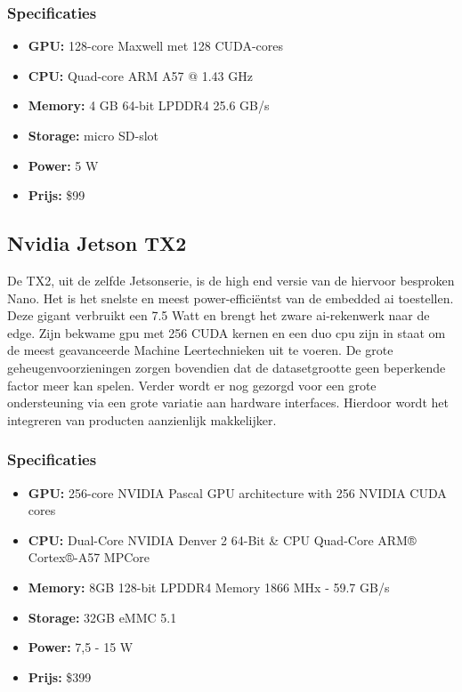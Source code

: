 		\subsubsection{Specificaties}
		\begin{itemize}
			\item \textbf{GPU:} 128-core Maxwell met 128 CUDA-cores
			\item \textbf{CPU:} Quad-core ARM A57 @ 1.43 GHz
			\item \textbf{Memory:} 4 GB 64-bit LPDDR4 25.6 GB/s
			\item \textbf{Storage:}  micro SD-slot
			\item \textbf{Power:} 5 W
			\item \textbf{Prijs:} \$99
		\end{itemize}	
	
	
	\subsection{Nvidia Jetson TX2}
	De TX2, uit de zelfde Jetsonserie, is de high end versie van de hiervoor besproken Nano\citep{bron:jetsontx2}. Het is het snelste en meest power-effici\"entst van de embedded \gls{ai} toestellen. Deze gigant verbruikt een 7.5 Watt en brengt het zware \gls{ai}-rekenwerk naar de edge. Zijn bekwame \gls{gpu} met 256 CUDA kernen en een duo \gls{cpu} zijn in staat om de meest geavanceerde Machine Leertechnieken uit te voeren. De grote geheugenvoorzieningen zorgen bovendien dat de datasetgrootte geen beperkende factor meer kan spelen. Verder wordt er nog gezorgd voor een grote ondersteuning via een grote variatie aan hardware interfaces. Hierdoor wordt het integreren van producten aanzienlijk makkelijker.
	
		\subsubsection{Specificaties}
		\begin{itemize}
			\item \textbf{GPU:} 256-core NVIDIA Pascal GPU architecture with 256 NVIDIA CUDA cores
			\item \textbf{CPU:} Dual-Core NVIDIA Denver 2 64-Bit \& CPU Quad-Core ARM® Cortex®-A57 MPCore
			\item \textbf{Memory:} 8GB 128-bit LPDDR4 Memory 1866 MHx - 59.7 GB/s
			\item \textbf{Storage:}  32GB eMMC 5.1
			\item \textbf{Power:} 7,5 - 15 W
			\item \textbf{Prijs:} \$399
		\end{itemize}	
	
